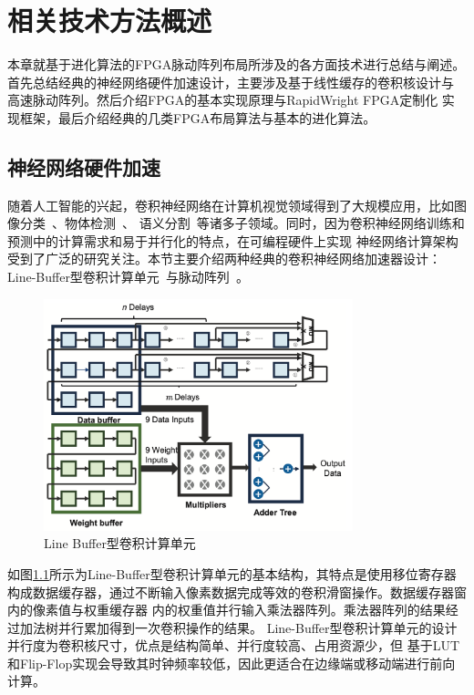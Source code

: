 \chapter{相关技术方法概述}


本章就基于进化算法的FPGA脉动阵列布局所涉及的各方面技术进行总结与阐述。
首先总结经典的神经网络硬件加速设计，主要涉及基于线性缓存的卷积核设计与
高速脉动阵列。然后介绍FPGA的基本实现原理与RapidWright FPGA定制化
实现框架，最后介绍经典的几类FPGA布局算法与基本的进化算法。

\section{神经网络硬件加速}

随着人工智能的兴起，卷积神经网络在计算机视觉领域得到了大规模应用，比如图像分类~\cite{szegedy2017inception}、物体检测~\cite{redmon2018yolov3}、
语义分割~\cite{barkau1996unet}等诸多子领域。同时，因为卷积神经网络训练和预测中的计算需求和易于并行化的特点，在可编程硬件上实现
神经网络计算架构受到了广泛的研究关注。本节主要介绍两种经典的卷积神经网络加速器设计：
Line-Buffer型卷积计算单元~\cite{qiu2016going}与脉动阵列~\cite{nachiket_stc_fpl2019}。

\begin{figure}[h]
	\centering
	\includegraphics[width=0.8\textwidth]{figure/line-buffer}
	\caption{Line Buffer型卷积计算单元~\cite{qiu2016going}} 
	\label{fig:conv}
\end{figure}

如图\ref{fig:conv}所示为Line-Buffer型卷积计算单元的基本结构，其特点是使用移位寄存器
构成数据缓存器，通过不断输入像素数据完成等效的卷积滑窗操作。数据缓存器窗内的像素值与权重缓存器
内的权重值并行输入乘法器阵列。乘法器阵列的结果经过加法树并行累加得到一次卷积操作的结果。
Line-Buffer型卷积计算单元的设计并行度为卷积核尺寸，优点是结构简单、并行度较高、占用资源少，但
基于LUT和Flip-Flop实现会导致其时钟频率较低，因此更适合在边缘端或移动端进行前向计算。

